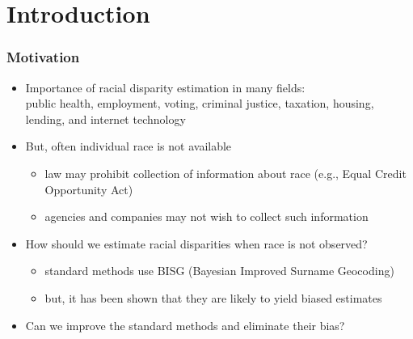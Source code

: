 \documentclass[handout]{beamer}
\title[]{\tit}
\institute[Harvard]{\large Harvard University }
\date{Keynote Talk \\ Promises and Limits of Inferring Protected-Class Data\\ for Disparate
Impact Testing of AI Systems\\
  September 8, 2023 \\  \vspace{.25in} Joint work with
  Cory McCartan, Jacob Goldin, and Daniel E. Ho }
\author[Kosuke Imai]{\large Kosuke Imai }
\begin{document}
\frame{\titlepage}



\section{Introduction}

\begin{frame}

  \frametitle{Motivation}

  \begin{itemize}
  \item Importance of racial disparity estimation in many fields:\\
    public health, employment, voting, criminal justice, taxation,
    housing, lending, and internet technology

    \vfill
  \item But, often individual race is not available
    \begin{itemize}
    \item law may prohibit collection of information about race
      (e.g., Equal Credit Opportunity Act)
    \item agencies and companies may not wish to collect such information
    \end{itemize}
    \vfill
  \item How should we estimate racial disparities when race is not
    observed?
    \begin{itemize}
    \item standard methods use BISG (Bayesian Improved Surname
      Geocoding)
    \item but, it has been shown that they are likely to yield biased estimates
    \end{itemize}

  \item Can we improve the standard methods and eliminate their bias? 
  \end{itemize}

\end{frame}
\end{document}
